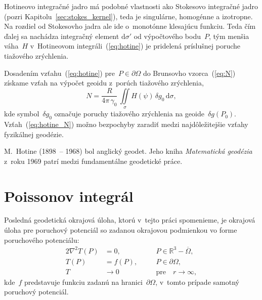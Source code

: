 \documentclass[a4paper,12pt]{book}
\newcommand{\diff}{\mathrm d}
\begin{document}
Hotineovo integračné jadro má podobné vlastnosti ako Stokesovo integračné jadro 
(pozri Kapitolu~\ref{sec:stokes_kernel}), teda je singulárne, homogénne 
a izotropne.  Na rozdiel od Stokesovho jadra ale ide o~monotónne klesajúcu 
funkciu.  Teda čím ďalej sa nachádza integračný element $\diff\sigma'$ od 
výpočtového bodu~$P$, tým menšia váha~$H$ v~Hotineovom 
integráli~(\ref{eq:hotine}) je pridelená príslušnej poruche tiažového 
zrýchlenia.

Dosadením vzťahu~(\ref{eq:hotine}) pre~$P \in \partial\Omega$ do Brunsovho 
vzorca~(\ref{eq:N}) získame vzťah na výpočet geoidu z~porúch tiažového 
zrýchlenia,
%
\begin{equation}
\label{eq:hotine_N}
N = \frac{R}{4\pi \, \gamma_0} \, \iint\limits_{\sigma} H(\psi) \, \delta g_0 
\, \diff \sigma{,}
\end{equation}
%
kde symbol~$\delta g_0$ označuje poruchy tiažového zrýchlenia na geoide~$\delta 
g(P_0)$.  Vzťah~(\ref{eq:hotine_N}) možno bezpochyby zaradiť medzi 
najdôležitejšie vzťahy fyzikálnej geodézie.

M.~Hotine (1898~-- 1968) bol anglický geodet.  Jeho kniha \textit{Matematická 
geodézia} z~roku 1969 patrí medzi fundamentálne geodetické práce.

\section{Poissonov integrál}
\label{sec:poisson_integral}

Posledná geodetická okrajová úloha, ktorú v~tejto práci spomenieme, je okrajová 
úloha pre poruchový potenciál so zadanou okrajovou podmienkou vo forme 
poruchového potenciálu:
%
\begin{alignat}{2}
\nabla^2 T(P) &= 0{,} &&P \in \mathbb{R}^3 
- \overline\Omega{,}\label{eq:bvp_t_laplace}\\
T(P) &= f(P){,} \quad &&P \in 
\partial\Omega{,}\label{eq:bvp_t_boundary_condition}\\
T &\rightarrow 0 &&\textrm{pre} \quad r \rightarrow 
\infty{,}\label{eq:bvp_t_t_infty}
\end{alignat}
%
kde~$f$ predstavuje funkciu zadanú na hranici~$\partial\Omega$, v~tomto prípade 
samotný poruchový potenciál.
\end{document}
